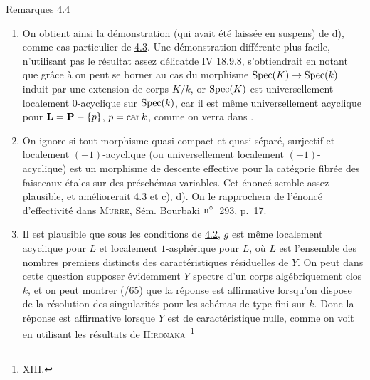 \documentclass[10pt]{../fichiers-configuration-latex/smfart}
\begin{document}
\begin{enonce*}[remark]{Remarques 4.4}
\begin{enumerate}
\renewcommand{\theenumi}{\alph{enumi}}
\renewcommand{\labelenumi}{\theenumi)}
\item On obtient ainsi la démonstration (qui avait été laissée en
suspens) de  d), comme cas particulier de \hyperref[XV.cor4.3]{4.3}. %
Une démonstration différente plus facile, n'utilisant pas le résultat
assez délicat\pageoriginale de \EGA IV 18.9.8, s'obtiendrait en notant
que grâce à  on peut se borner au cas du morphisme
$\operatorname{Spec}(K)\rightarrow \operatorname{Spec}(k)$ induit par une extension de corps
$K/k$, or $\operatorname{Spec}(K)$ est universellement localement $0$-acyclique sur
$\operatorname{Spec}(k)$, car il est même universellement acyclique pour
$\mathbf{L}=\mathbf{P}-\{p\}$, $p=\operatorname{car} k$, comme on verra dans .

\item On ignore si tout morphisme quasi-compact et quasi-séparé,
surjectif et localement $(-1)$-acyclique (ou universellement
localement $(-1)$-acyclique) est un morphisme de descente effective
pour la catégorie fibrée des faisceaux étales sur des préschémas
variables. Cet énoncé semble assez plausible, et améliorerait \hyperref[XV.cor4.3]{4.3} et
 c), d). %
On le rapprochera de l'énoncé d'effectivité dans
\textsc{Murre}, Sém. Bourbaki ${\rm n^{\circ}}$~293, p.~17.

\item Il est plausible que sous les conditions de \hyperref[XV.cor4.2]{4.2}, $g$ est même
localement acyclique pour $L$ et localement $1$-asphérique pour $L$,
où $L$ est l'ensemble des nombres premiers distincts des
caractéristiques résiduelles de $Y$. On peut dans cette question
supposer évidemment $Y$ spectre d'un corps algébriquement clos $k$, et
on peut montrer (/65) que la réponse est affirmative
lorsqu'on dispose de la résolution des singularités pour les schémas
de type fini sur $k$. Donc la réponse est affirmative lorsque $Y$ est
de caractéristique nulle, comme on voit en utilisant les résultats de
\textsc{Hironaka}~\footnote[1]{\Cf {} XIII.}
\end{enumerate}
\end{enonce*}



\ifx\danslelivre\undefined
\end{document}
